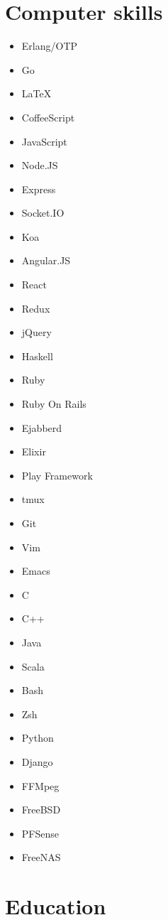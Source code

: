 \documentclass[11pt,a4paper,roman,english]{moderncv}        %
\begin{document}



\makecvtitle
\section{Computer skills}
\begin{multicols}{4}
	\begin{itemize}
		\item[] Erlang/OTP
		\item[] Go
		\item[] \LaTeX
		\item[] CoffeeScript
		\item[] JavaScript
		\item[] Node.JS
		\item[] Express
		\item[] Socket.IO
		\item[] Koa
		\item[] Angular.JS
		\item[] React
		\item[] Redux
		\item[] jQuery
		\item[] Haskell
		\item[] Ruby
		\item[] Ruby On Rails
		\item[] Ejabberd
		\item[] Elixir
		\item[] Play Framework
		\item[] tmux
		\item[] Git
		\item[] Vim
		\item[] Emacs
		\item[] C
		\item[] C++
		\item[] Java
		\item[] Scala
		\item[] Bash
		\item[] Zsh
		\item[] Python
		\item[] Django
		\item[] FFMpeg
		\item[] FreeBSD
		\item[] PFSense
		\item[] FreeNAS
	\end{itemize}
\end{multicols}
\section{Education}
\end{document}
